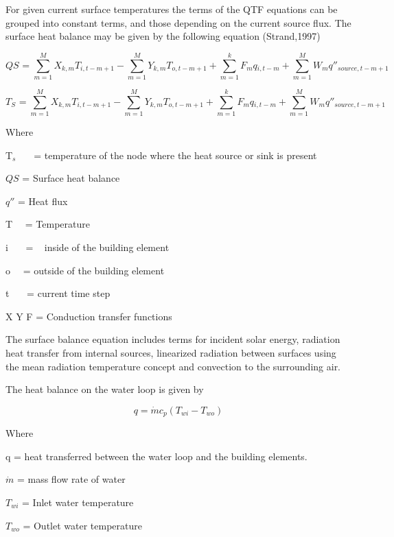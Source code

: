 For given current surface temperatures the terms of the QTF equations can be grouped into constant terms, and those depending on the current source flux. The surface heat balance may be given by the following equation (Strand,1997)

\begin{equation}
QS{}_{} = \sum\limits_{m = 1}^M {X{}_{k,m}} T{}_{i,t - m + 1} - \sum\limits_{m = 1}^M {Y{}_{k,m}} T{}_{o,t - m + 1} + \sum\limits_{m = 1}^k {F{}_m} q{}_{i,t - m} + \sum\limits_{m = 1}^M {W{}_m} {q''}{}_{source,t - m + 1}
\end{equation}

\begin{equation}
T{}_S{}_{} = \sum\limits_{m = 1}^M {X{}_{k,m}} T{}_{i,t - m + 1} - \sum\limits_{m = 1}^M {Y{}_{k,m}} T{}_{o,t - m + 1} + \sum\limits_{m = 1}^k {F{}_m} q{}_{i,t - m} + \sum\limits_{m = 1}^M {W{}_m} q''{}_{source,t - m + 1}
\end{equation}

Where

T\(_{s}\)~~~ = temperature of the node where the heat source or sink is present

\(QS\) = Surface heat balance

\({q''}\) = Heat flux

T~~ = Temperature

i~~~ = ~ inside of the building element

o~~ = outside of the building element

t~~~ = current time step

X Y F = Conduction transfer functions

The surface balance equation includes terms for incident solar energy, radiation heat transfer from internal sources, linearized radiation between surfaces using the mean radiation temperature concept and convection to the surrounding air.

The heat balance on the water loop is given by

\begin{equation}
q = \dot mc{}_p(T{}_{wi} - T{}_{wo})
\end{equation}

Where

q = heat transferred between the water loop and the building elements.

\(\dot m\) = mass flow rate of water

\(T{}_{wi}\) = Inlet water temperature

\(T{}_{wo}\) = Outlet water temperature


